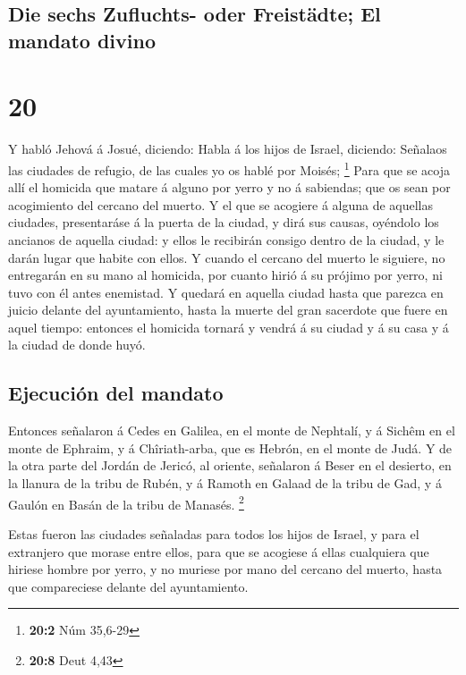 \hypertarget{die-sechs-zufluchts--oder-freistuxe4dte-el-mandato-divino}{%
\subsection{Die sechs Zufluchts- oder Freistädte; El mandato
divino}\label{die-sechs-zufluchts--oder-freistuxe4dte-el-mandato-divino}}

\hypertarget{section-19}{%
\section{20}\label{section-19}}

 Y habló Jehová á Josué, diciendo:  Habla á los
hijos de Israel, diciendo: Señalaos las ciudades de refugio, de las
cuales yo os hablé por Moisés; \footnote{\textbf{20:2} Núm 35,6-29}
 Para que se acoja allí el homicida que matare á alguno por
yerro y no á sabiendas; que os sean por acogimiento del cercano del
muerto.  Y el que se acogiere á alguna de aquellas ciudades,
presentaráse á la puerta de la ciudad, y dirá sus causas, oyéndolo los
ancianos de aquella ciudad: y ellos le recibirán consigo dentro de la
ciudad, y le darán lugar que habite con ellos.  Y cuando el
cercano del muerto le siguiere, no entregarán en su mano al homicida,
por cuanto hirió á su prójimo por yerro, ni tuvo con él antes enemistad.
 Y quedará en aquella ciudad hasta que parezca en juicio
delante del ayuntamiento, hasta la muerte del gran sacerdote que fuere
en aquel tiempo: entonces el homicida tornará y vendrá á su ciudad y á
su casa y á la ciudad de donde huyó.

\hypertarget{ejecuciuxf3n-del-mandato}{%
\subsection{Ejecución del mandato}\label{ejecuciuxf3n-del-mandato}}

 Entonces señalaron á Cedes en Galilea, en el monte de
Nephtalí, y á Sichêm en el monte de Ephraim, y á Chîriath-arba, que es
Hebrón, en el monte de Judá.  Y de la otra parte del Jordán
de Jericó, al oriente, señalaron á Beser en el desierto, en la llanura
de la tribu de Rubén, y á Ramoth en Galaad de la tribu de Gad, y á
Gaulón en Basán de la tribu de Manasés. \footnote{\textbf{20:8} Deut
  4,43}

 Estas fueron las ciudades señaladas para todos los hijos de
Israel, y para el extranjero que morase entre ellos, para que se
acogiese á ellas cualquiera que hiriese hombre por yerro, y no muriese
por mano del cercano del muerto, hasta que compareciese delante del
ayuntamiento.

